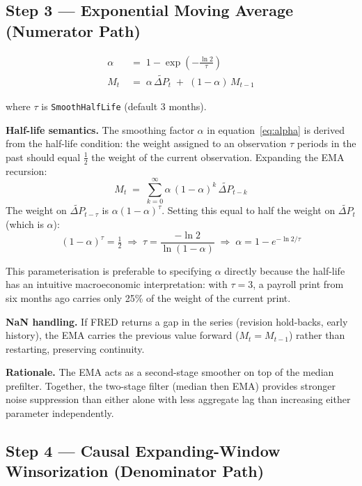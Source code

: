 \documentclass[11pt, a4paper]{article}
\newcommand{\dP}{\Delta P}
\begin{document}
\subsection{Step 3 — Exponential Moving Average (Numerator Path)}
\label{sec:step3}

\begin{align}
  \alpha &\;=\; 1 - \exp\!\left(-\frac{\ln 2}{\tau}\right) \label{eq:alpha}\\[6pt]
  M_t &\;=\; \alpha\,\tilde{\dP}_t \;+\; (1-\alpha)\,M_{t-1} \label{eq:ema}
\end{align}

where $\tau$ is \texttt{SmoothHalfLife} (default 3 months).

\textbf{Half-life semantics.} The smoothing factor $\alpha$ in
equation~\eqref{eq:alpha} is derived from the half-life condition:
the weight assigned to an observation $\tau$ periods in the past
should equal $\tfrac{1}{2}$ the weight of the current observation.
Expanding the EMA recursion:
\begin{equation}
  M_t \;=\; \sum_{k=0}^{\infty} \alpha\,(1-\alpha)^k\,\tilde{\dP}_{t-k}
\end{equation}
The weight on $\tilde{\dP}_{t-\tau}$ is $\alpha(1-\alpha)^\tau$.
Setting this equal to half the weight on $\tilde{\dP}_t$ (which is
$\alpha$):
\begin{equation}
  (1-\alpha)^\tau = \tfrac{1}{2}
  \;\Longrightarrow\;
  \tau = \frac{-\ln 2}{\ln(1-\alpha)}
  \;\Longrightarrow\;
  \alpha = 1 - e^{-\ln2/\tau}
\end{equation}

This parameterisation is preferable to specifying $\alpha$ directly
because the half-life has an intuitive macroeconomic interpretation:
with $\tau = 3$, a payroll print from six months ago carries only
25\% of the weight of the current print.

\textbf{NaN handling.} If FRED returns a gap in the series (revision
hold-backs, early history), the EMA carries the previous value
forward ($M_t = M_{t-1}$) rather than restarting, preserving
continuity.

\textbf{Rationale.} The EMA acts as a second-stage smoother on top
of the median prefilter. Together, the two-stage filter (median then
EMA) provides stronger noise suppression than either alone with less
aggregate lag than increasing either parameter independently.

\subsection{Step 4 — Causal Expanding-Window Winsorization (Denominator Path)}
\label{sec:step4}
\end{document}
